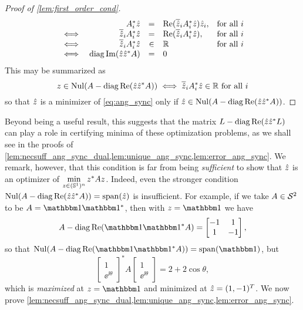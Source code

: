 \begin{proof}[Proof of \cref{lem:first_order_cond}]
  \[
  \begin{array}{crcll}
    & A_i^* \hat{z} & = & \operatorname{Re}(\overline{\hat{z}}_i A_i^* \hat{z}) \hat{z}_i, & \text{for all}\ i \\
    \iff & \overline{\hat{z}}_i A_i^* \hat{z} & = & \operatorname{Re}(\overline{\hat{z}}_i A_i^* \hat{z}), & \text{for all}\ i \\
    \iff & \overline{\hat{z}}_i A_i^* \hat{z} & \in & \mathbb{R} & \text{for all}\ i \\
    \iff & \operatorname{diag} \operatorname{Im}(\hat{z} \hat{z}^* A) & = & 0
  \end{array}
  \]
  This may be summarized as \begin{equation} z \in \operatorname{Nul}(A - \operatorname{diag} \operatorname{Re}(\hat{z} \hat{z}^* A)) \iff \overline{\hat{z}}_i A_i^* \hat{z} \in \mathbb{R} \ \text{for all}\ i \label{eq:null_iff_real} \end{equation} so that $\hat{z}$ is a minimizer of \eqref{eq:ang_sync} only if $\hat{z} \in \operatorname{Nul}(A - \operatorname{diag}\operatorname{Re}(\hat{z}\hat{z}^* A))$.
\end{proof}

Beyond being a useful result, this suggests that the matrix $L - \operatorname{diag}\operatorname{Re}(\hat{z}\hat{z}^* L)$ can play a role in certifying minima of these optimization problems, as we shall see in the proofs of \cref{lem:necsuff_ang_sync_dual,lem:unique_ang_sync,lem:error_ang_sync}.  We remark, however, that this condition is far from being \emph{sufficient} to show that $\hat{z}$ is an optimizer of $\min\limits_{z \in (\mathbb{S}^1)^n} z^* A z$.  Indeed, even the stronger condition $\operatorname{Nul}(A - \operatorname{diag}\operatorname{Re}(\hat{z}\hat{z}^* A)) = \operatorname{span}(\hat{z})$ is insufficient.  For example, if we take $A \in \mathcal{S}^2$ to be $A = \one \one^*$, then with $z = \one$ we have \[A - \diag \Re (\one \one^* A) = \begin{bmatrix} -1 & 1 \\ 1 & -1 \end{bmatrix},\] so that $\Nul(A - \diag \Re (\one \one^* A)) = \Span(\one)$, but \[\begin{bmatrix} 1 \\ \ee^{\ii \theta} \end{bmatrix}^* A \begin{bmatrix} 1 \\ \ee^{\ii \theta} \end{bmatrix} = 2 + 2 \cos \theta,\] which is \emph{maximized} at $z = \one$ and minimized at $\hat{z} = (1, -1)^T$.  We now prove \cref{lem:necsuff_ang_sync_dual,lem:unique_ang_sync,lem:error_ang_sync}.

